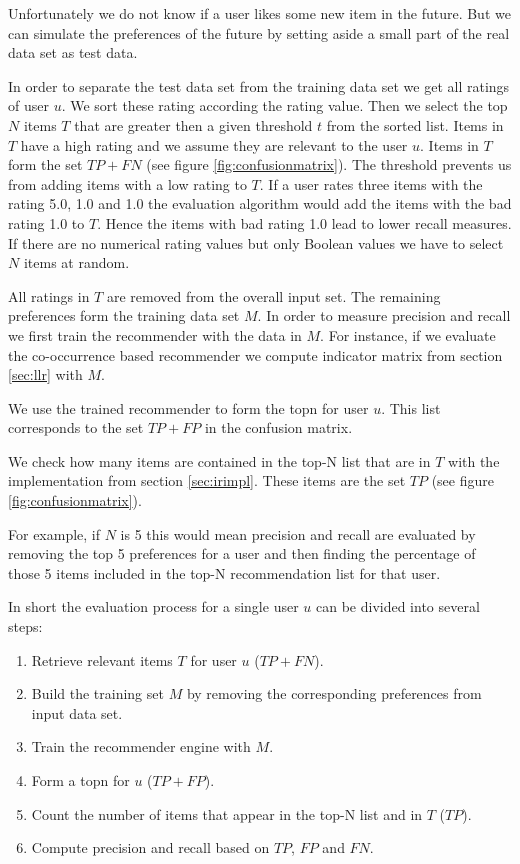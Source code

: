 Unfortunately we do not know if a user likes some new item in the future.
But we can simulate the preferences of the future by setting aside a small part of the real data set as test data.

In order to separate the test data set from the training data set we get all ratings of user $u$. We sort these rating according the rating value. Then we select the top $N$ items $T$ that are greater then a given threshold $t$ from the sorted list. Items in $T$ have a high rating and we assume they are relevant to the user $u$. Items in $T$ form the set $TP + FN$ (see figure \ref{fig:confusionmatrix}). 
The threshold prevents us from adding items with a low rating to $T$. If a user rates three items with the rating 5.0, 1.0 and 1.0 the evaluation algorithm would add the items with the bad rating 1.0 to $T$. Hence the items with bad rating 1.0 lead to lower recall measures. 
If there are no numerical rating values but only Boolean values we have to select $N$ items at random.

All ratings in $T$ are removed from the overall input set. The remaining preferences form the training data set $M$. In order to measure precision and recall we first train the recommender with the data in $M$. For instance, if we evaluate the co-occurrence based recommender we compute indicator matrix from section \ref{sec:llr} with $M$.

We use the trained recommender to form the \gls{topn} for user $u$. This list corresponds to the set $TP + FP$ in the confusion matrix.

We check how many items are contained in the top-N list that are in $T$ with the implementation from section \ref{sec:irimpl}. These items are the set $TP$ (see figure \ref{fig:confusionmatrix}). 

For example, if $N$ is 5 this would mean \gls{precision} and recall are evaluated by removing the top 5 preferences for a user and then finding the percentage of those 5 items included in the top-N recommendation list for that user. 

In short the evaluation process for a single user $u$ can be divided into several steps:
\begin{enumerate}
\item Retrieve relevant items $T$ for user $u$ ($TP+FN$).
\item Build the training set $M$ by removing the corresponding preferences from input data set.
\item Train the recommender engine with $M$.
\item Form a \gls{topn} for $u$ ($TP+FP$).
\item Count the number of items that appear in the top-N list and in $T$ ($TP$).
\item Compute precision and recall based on $TP$, $FP$ and $FN$.
\end{enumerate}

